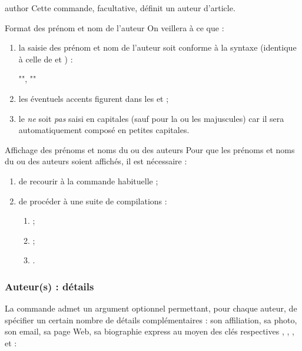 \begin{docCommand}{author}{}
  Cette commande, facultative, définit un auteur d'article.
\end{docCommand}
%
\begin{dbwarning}{Format des prénom et nom de l'auteur}{}
  On veillera à ce que :
  \begin{enumerate}
  \item la saisie des prénom et nom de l'auteur soit conforme à la syntaxe
    (identique à celle de  et ) :
\begin{bodycode}[listing options={showspaces}]
"", ""
\end{bodycode}
  \item les éventuels accents figurent dans les  et
     ;
  \item le  \emph{ne} soit \emph{pas} saisi en capitales
    (sauf pour la ou les majuscules) car il sera automatiquement
    composé en petites capitales.
  \end{enumerate}
\end{dbwarning}

\begin{dbwarning}{Affichage des prénoms et noms du ou des auteurs}{}
  Pour que les prénoms et noms du ou des auteurs soient affichés, il est
  nécessaire :
  \begin{enumerate}
  \item de recourir à la commande habituelle  ;
  \item de procéder à une suite de compilations\suitecompilations{} :
    \begin{enumerate}
    \item {} ;
    \item {} ;
    \item {}.
    \end{enumerate}
  \end{enumerate}
\end{dbwarning}

\subsubsection{Auteur(s) : détails}
\label{sec-auteurs-details}

La commande  admet un argument optionnel permettant, pour chaque
auteur, de spécifier un certain nombre de détails complémentaires : son affiliation, sa
photo, son email, sa page Web, sa biographie express au moyen des clés
respectives %
, , ,  et
 :
\begin{bodycode}
\author[%
  affiliation="\marg{affiliation(s)}",%
  photo="\meta{photo}",%
  email="\meta{email}",%
  webpage="\meta{page Web}",%
  minibio="\marg{biographie express}"%
]{"", ""}
\end{bodycode}

